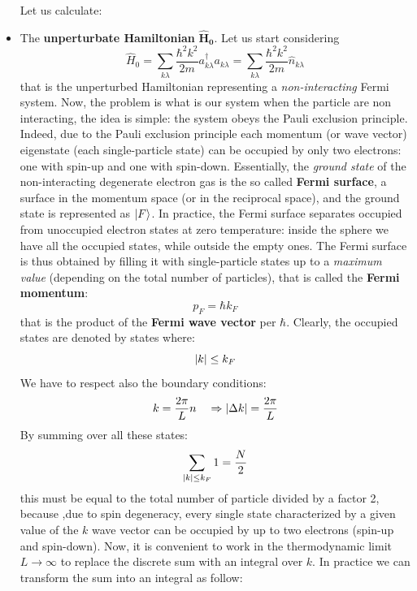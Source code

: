 \documentclass[11pt, a4paper, twoside, openright]{article}
\begin{document}
\begin{itemize}
Let us calculate:
\item The \textbf{unperturbate Hamiltonian} \( \mathbf{\hat{H}_0 } \).
Let us start considering
\begin{equation*}
  \hat{H}_0 = \sum_{k \lambda }^{} \frac{\hbar ^2 k^2}{2m} a_{k \lambda } ^\dag a_{k\lambda } = \sum_{k\lambda }^{} \frac{\hbar ^2 k^2}{2m} \hat{n}_{k \lambda }
\end{equation*}
that is the unperturbed Hamiltonian representing a \emph{non-interacting} Fermi system.
Now, the problem is what is our system when the particle are non interacting, the idea is simple: the system obeys the Pauli exclusion principle. Indeed, due to the Pauli exclusion principle each momentum (or wave vector) eigenstate (each single-particle state) can be occupied by only two electrons: one with spin-up and one with spin-down.
Essentially, the \emph{ground state} of the non-interacting degenerate electron gas is the so called \textbf{Fermi surface}, a surface in the momentum space (or in the reciprocal space), and the ground state is represented as \( \ket{F}  \).
In practice, the Fermi surface separates occupied from unoccupied electron states at zero temperature: inside the sphere we have all the occupied states, while outside the empty ones.
The Fermi surface is thus obtained by filling it with single-particle states up to a \emph{maximum value} (depending on the total number of particles), that is called the \textbf{Fermi momentum}:
\begin{equation*}
  p_F = \hbar k_F
\end{equation*}
that is the product of the \textbf{Fermi wave vector} per \( \hbar  \).
Clearly, the occupied states are denoted by states where:
\begin{equation*}
  \abs{k}  \le k_F
\end{equation*}
We have to respect also the boundary conditions:
\begin{equation*}
  k = \frac{2 \pi }{L}n \quad \Rightarrow   \abs{\Delta k}= \frac{2 \pi }{L}
\end{equation*}
By summing over all these states:
\begin{equation*}
  \sum_{\abs{k}  \le k_F }^{} 1 = \frac{N}{2}
\end{equation*}
this must be equal to the total number of particle divided by a factor 2, because ,due to spin degeneracy, every single state characterized by a given value of the \( k \)  wave vector can be occupied by up to two electrons (spin-up and spin-down).
Now, it is convenient to work in the thermodynamic limit \( L \rightarrow \infty  \) to replace the discrete sum with an integral over \( k \). In practice we can transform the sum into an integral as follow:

\end{itemize}
\end{document}
